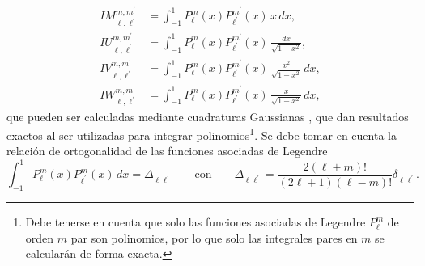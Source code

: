 \begin{align}
IM_{\ell,\ell^{\prime}}^{m,m^{\prime}} &=\int_{-1}^1 P_{\ell}^{m}(x) P_{\ell^{\prime}}^{m^{\prime}}(x) \,x \, dx, \\
IU_{\ell,\ell^{\prime}}^{m,m^{\prime}} &=\int_{-1}^1 P_{\ell}^{m}(x) P_{\ell^{\prime}}^{m^{\prime}}(x) \, \frac{dx}{\sqrt{1-x^2}}, \\
IV_{\ell,\ell^{\prime}}^{m,m^{\prime}} &=\int_{-1}^1 P_{\ell}^{m}(x) P_{\ell^{\prime}}^{m^{\prime}}(x) \, \frac{x^2}{\sqrt{1-x^2}} \, dx, \\
IW_{\ell,\ell^{\prime}}^{m,m^{\prime}} &=\int_{-1}^1 P_{\ell}^{m}(x) P_{\ell^{\prime}}^{m^{\prime}}(x) \, \frac{x}{\sqrt{1-x^2}} \, dx, 
\end{align}
que pueden ser calculadas mediante cuadraturas Gaussianas \cite{kahaner1989numerical}, que dan resultados exactos al ser utilizadas para integrar polinomios\footnote{Debe tenerse en cuenta que solo las funciones asociadas de Legendre $P_{\ell}^m$ de orden $m$ par son polinomios, por lo que solo las integrales pares en $m$ se calcularán de forma exacta.}. Se debe tomar en cuenta la relación de ortogonalidad de las funciones asociadas de Legendre \cite{Abramowitz}
\begin{equation}
\int_{-1}^{1} P_{\ell}^{m}(x) P_{\ell^{\prime}}^{m}(x) \, dx = \Delta_{\ell \ell^{\prime}} \qquad \text{con} \qquad \Delta_{\ell \ell^{\prime}}= \frac{2(\ell+m)!}{(2\ell+1)(\ell-m)!} \delta_{\ell \ell^{\prime}}.
\end{equation}

